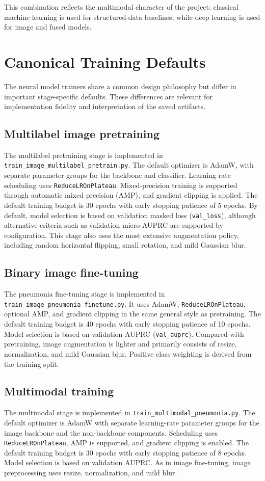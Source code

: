 This combination reflects the multimodal character of the project: classical machine learning is used for structured-data baselines, while deep learning is used for image and fused models.

\section{Canonical Training Defaults}

The neural model trainers share a common design philosophy but differ in important stage-specific defaults. These differences are relevant for implementation fidelity and interpretation of the saved artifacts.

\subsection*{Multilabel image pretraining}
The multilabel pretraining stage is implemented in \texttt{train\_image\_multilabel\_pretrain.py}. The default optimizer is AdamW, with separate parameter groups for the backbone and classifier. Learning rate scheduling uses \texttt{ReduceLROnPlateau}. Mixed-precision training is supported through automatic mixed precision (AMP), and gradient clipping is applied. The default training budget is 30 epochs with early stopping patience of 5 epochs. By default, model selection is based on validation masked loss (\texttt{val\_loss}), although alternative criteria such as validation micro-AUPRC are supported by configuration. This stage also uses the most extensive augmentation policy, including random horizontal flipping, small rotation, and mild Gaussian blur.

\subsection*{Binary image fine-tuning}
The pneumonia fine-tuning stage is implemented in \texttt{train\_image\_pneumonia\_finetune.py}. It uses AdamW, \texttt{ReduceLROnPlateau}, optional AMP, and gradient clipping in the same general style as pretraining. The default training budget is 40 epochs with early stopping patience of 10 epochs. Model selection is based on validation AUPRC (\texttt{val\_auprc}). Compared with pretraining, image augmentation is lighter and primarily consists of resize, normalization, and mild Gaussian blur. Positive class weighting is derived from the training split.

\subsection*{Multimodal training}
The multimodal stage is implemented in \texttt{train\_multimodal\_pneumonia.py}. The default optimizer is AdamW with separate learning-rate parameter groups for the image backbone and the non-backbone components. Scheduling uses \texttt{ReduceLROnPlateau}, AMP is supported, and gradient clipping is enabled. The default training budget is 30 epochs with early stopping patience of 8 epochs. Model selection is based on validation AUPRC. As in image fine-tuning, image preprocessing uses resize, normalization, and mild blur.

